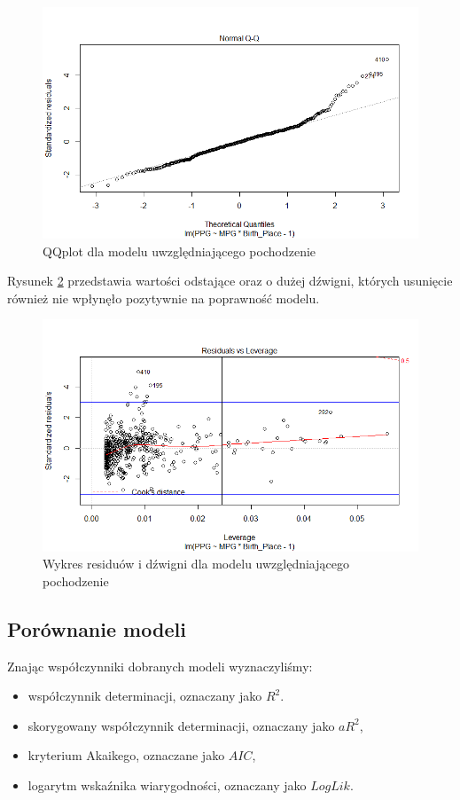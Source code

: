 \documentclass[11pt,a4paper]{article}
\begin{document}
\begin{figure}[t]
\includegraphics[width=\textwidth]{origin_2}
\caption{QQplot dla modelu uwzględniającego pochodzenie}
\label{qqplot_origin}
\centering
\end{figure}
Rysunek \ref{leverage_origin} przedstawia wartości odstające oraz o dużej dźwigni, których usunięcie również nie wpłynęło pozytywnie na poprawność modelu.
\begin{figure}[t]
\includegraphics[width=\textwidth]{origin_4}
\caption{Wykres residuów i dźwigni dla modelu uwzględniającego pochodzenie}
\label{leverage_origin}
\centering
\end{figure}

\subsection{Porównanie modeli}
Znając współczynniki dobranych modeli wyznaczyliśmy:
\begin{itemize}
	\item współczynnik determinacji, oznaczany jako $R^2$.
	\item skorygowany współczynnik determinacji, oznaczany jako $aR^2$,
	\item kryterium Akaikego, oznaczane jako $AIC$,
	\item logarytm wskaźnika wiarygodności, oznaczany jako $LogLik$.
\end{itemize}
\end{document}
